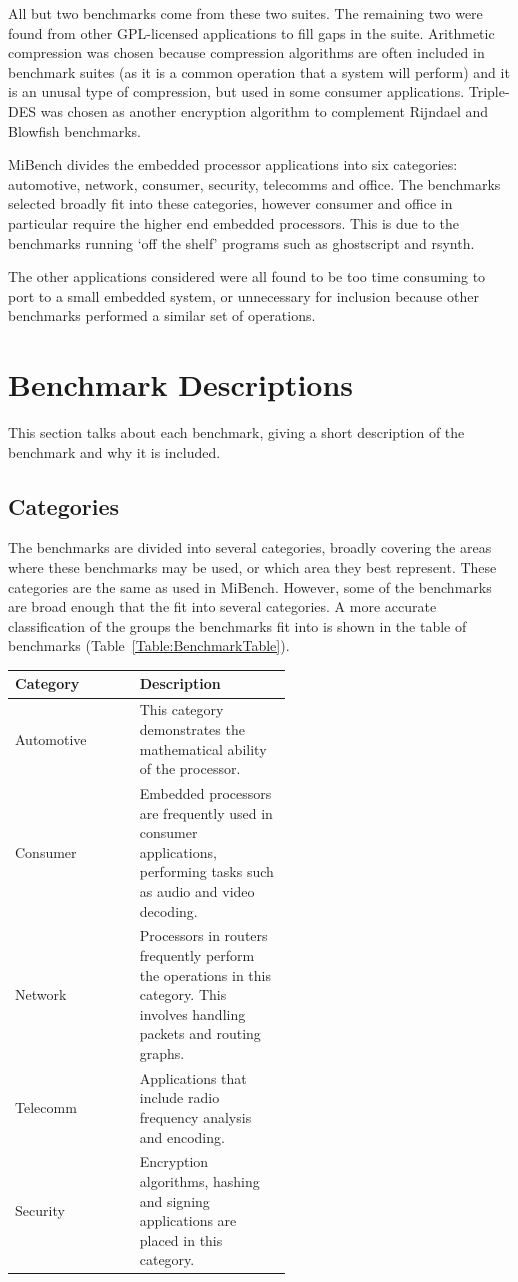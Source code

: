 \documentclass[twocolumn]{article}
\begin{document}
All but two benchmarks come from these two suites. The remaining two were found from other GPL-licensed applications to fill gaps in the suite. Arithmetic compression\cite{Howard1992} was chosen because compression algorithms are often included in benchmark suites (as it is a common operation that a system will perform) and it is an unusal type of compression, but used in some consumer applications. Triple-DES was chosen as another encryption algorithm to complement Rijndael and Blowfish benchmarks.

MiBench divides the embedded processor applications into six categories: automotive, network, consumer, security, telecomms and office. The benchmarks selected broadly fit into these categories, however consumer and office in particular require the higher end embedded processors. This is due to the benchmarks running `off the shelf' programs such as ghostscript and rsynth.

The other applications considered were all found to be too time consuming to port to a small embedded system, or unnecessary for inclusion because other benchmarks performed a similar set of operations.


\section{Benchmark Descriptions}

This section talks about each benchmark, giving a short description of the benchmark and why it is included.

\subsection*{Categories}

The benchmarks are divided into several categories, broadly covering the areas where these benchmarks may be used, or which area they best represent. These categories are the same as used in MiBench. However, some of the benchmarks are broad enough that the fit into several categories. A more accurate classification of the groups the benchmarks fit into is shown in the table of benchmarks (Table~\ref{Table:BenchmarkTable}).

\begin{center}
	\begin{tabular}{l p{0.55\linewidth}}
		Category &	Description \\
		\hline
		Automotive 	& This category demonstrates the mathematical ability of the processor. \\
		Consumer	& Embedded processors are frequently used in consumer applications, performing tasks such as audio and video decoding. \\
		Network		& Processors in routers frequently perform the operations in this category. This involves handling packets and routing graphs. \\
		Telecomm	& Applications that include radio frequency analysis and encoding. \\
		Security	& Encryption algorithms, hashing and signing applications are placed in this category. \\
	\end{tabular}
\end{center}
\end{document}

